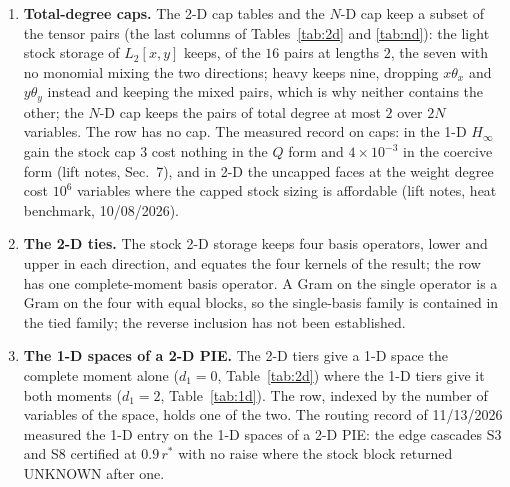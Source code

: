 \begin{enumerate}\setlength\itemsep{0pt}
\item \textbf{Total-degree caps.} The 2-D cap tables and the $N$-D  cap keep a subset of the tensor pairs (the last columns of Tables~\ref{tab:2d} and \ref{tab:nd}): the light stock storage of $L_2[x,y]$ keeps, of the $16$ pairs at lengths $2$, the seven with no monomial mixing the two directions; heavy keeps nine, dropping $x\theta_x$ and $y\theta_y$ instead and keeping the mixed pairs, which is why neither contains the other; the $N$-D cap keeps the pairs of total degree at most $2$ over $2N$ variables. The row has no cap. The measured record on caps: in the 1-D $H_\infty$ gain the stock  cap $3$ cost nothing in the $Q$ form and $4\times10^{-3}$ in the coercive form (lift notes, Sec.~7), and in 2-D the uncapped faces at the weight degree cost $10^6$ variables where the capped stock sizing is affordable (lift notes, heat benchmark, 10/08/2026).
\item \textbf{The 2-D  ties.} The stock 2-D storage keeps four basis operators, lower and upper in each direction, and equates the four kernels of the result; the row has one complete-moment basis operator. A Gram on the single operator is a Gram on the four with equal blocks, so the single-basis family is contained in the tied family; the reverse inclusion has not been established.
\item \textbf{The 1-D spaces of a 2-D PIE.} The 2-D tiers give a 1-D space the complete moment alone ($d_1=0$, Table~\ref{tab:2d}) where the 1-D tiers give it both moments ($d_1=2$, Table~\ref{tab:1d}). The row, indexed by the number of variables of the space, holds one of the two. The routing record of 11/13/2026 measured the 1-D entry on the 1-D spaces of a 2-D PIE: the edge cascades S3 and S8 certified at $0.9\,r^*$ with no raise where the stock block returned UNKNOWN after one.
\end{enumerate}

